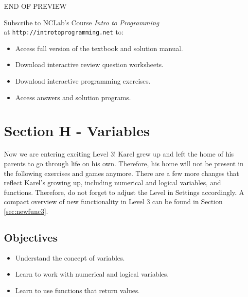 {{{{%
\newpage
\iffullversion
\else
\vbox{}
\vfill
\pagestyle{empty}
    \begin{center}
    {\huge \color{red}END OF PREVIEW}\\[2cm]
    {\Large Subscribe to NCLab's Course {\em Intro to Programming}\\ at {\tt http://introtoprogramming.net} to:\\[1.5cm]
\begin{itemize}
\item Access full version of the textbook and solution manual.
\item Download interactive review question worksheets.
\item Download interactive programming exercises.
\item Access answers and solution programs.
\end{itemize}
}
    \end{center}
\vfill
    
\fi



\section{Section H - Variables} \label{sec:var}

Now we are entering exciting Level 3! Karel grew up and left the home of his 
parents to go through life on his own. Therefore, his home will not be present
in the following exercises and games anymore. There are a few more changes
that reflect Karel's growing up, including numerical and logical variables,
and functions. Therefore, do not forget to adjust the 
Level in Settings accordingly. A compact overview of new functionality in Level 3
can be found in Section \ref{sec:newfunc3}.

\subsection{Objectives} 
 
\begin{itemize}
\item Understand the concept of variables.
\item Learn to work with numerical and logical variables.
\item Learn to use functions that return values. 
\end{itemize}

}}}}
